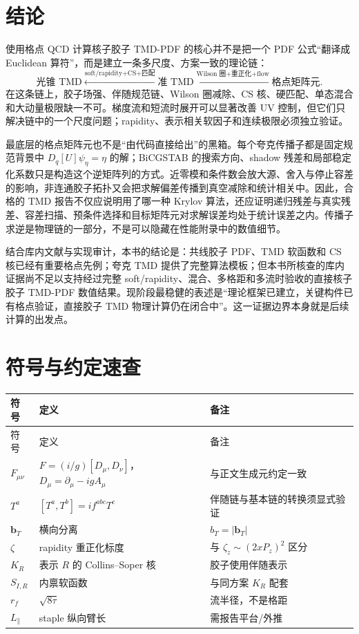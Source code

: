 \documentclass[UTF8,12pt,a4paper,twoside,openany]{ctexbook}
\newcommand{\bT}{\boldsymbol b_T}
\begin{document}
\clearpage
\chapter{结论}

使用格点 QCD 计算核子胶子 TMD-PDF 的核心并不是把一个 PDF 公式“翻译成 Euclidean 算符”，而是建立一条多尺度、方案一致的理论链：
\begin{equation}
  \text{光锥 TMD}
  \xleftarrow{\text{soft/rapidity+CS+匹配}}
  \text{准 TMD}
  \xleftarrow{\text{Wilson 圈+重正化+flow}}
  \text{格点矩阵元}.
  \label{eq:chain}
\end{equation}
在这条链上，胶子场强、伴随规范链、Wilson 圈减除、CS 核、硬匹配、单态混合和大动量极限缺一不可。梯度流和短流时展开可以显著改善 UV 控制，但它们只解决链中的一个尺度问题；rapidity、表示相关软因子和连续极限必须独立验证。

最底层的格点矩阵元也不是“由代码直接给出”的黑箱。每个夸克传播子都是固定规范背景中 \(D_q[U]\psi_\eta=\eta\) 的解；BiCGSTAB 的搜索方向、shadow 残差和局部稳定化系数只是构造这个逆矩阵列的方式。近零模和条件数会放大源、舍入与停止容差的影响，非连通胶子拓扑又会把求解偏差传播到真空减除和统计相关中。因此，合格的 TMD 报告不仅应说明用了哪一种 Krylov 算法，还应证明递归残差与真实残差、容差扫描、预条件选择和目标矩阵元对求解误差均处于统计误差之内。传播子求逆是物理链的一部分，不是可以隐藏在性能附录中的数值细节。

结合库内文献与实现审计，本书的结论是：共线胶子 PDF、TMD 软函数和 CS 核已经有重要格点先例；夸克 TMD 提供了完整算法模板；但本书所核查的库内证据尚不足以支持经过完整 soft/rapidity、混合、多格距和多流时验收的直接核子胶子 TMD-PDF 数值结果。现阶段最稳健的表述是“理论框架已建立，关键构件已有格点验证，直接胶子 TMD 物理计算仍在闭合中”。这一证据边界本身就是后续计算的出发点。

\appendix

\clearpage
\chapter{符号与约定速查}

\begin{longtable}{L{2.3cm}L{4.8cm}L{6.0cm}}
\toprule
符号 & 定义 & 备注 \\
\midrule
\endfirsthead
\toprule
符号 & 定义 & 备注 \\
\midrule
\endhead
\(F_{\mu\nu}\) & \(F=(i/g)[D_\mu,D_\nu]\)，\(D_\mu=\partial_\mu-igA_\mu\) & 与正文生成元约定一致 \\
\(T^a\) & \([T^a,T^b]=if^{abc}T^c\) & 伴随链与基本链的转换须显式验证 \\
\(\bT\) & 横向分离 & \(b_T=|\bT|\) \\
\(\zeta\) & rapidity 重正化标度 & 与 \(\zeta_z\sim(2xP_z)^2\) 区分 \\
\(K_R\) & 表示 \(R\) 的 Collins--Soper 核 & 胶子使用伴随表示 \\
\(S_{I,R}\) & 内禀软函数 & 与同方案 \(K_R\) 配套 \\
\(r_f\) & \(\sqrt{8\tau}\) & 流半径，不是格距 \\
\(L_\parallel\) & staple 纵向臂长 & 需报告平台/外推 \\
\bottomrule
\end{longtable}
\end{document}
